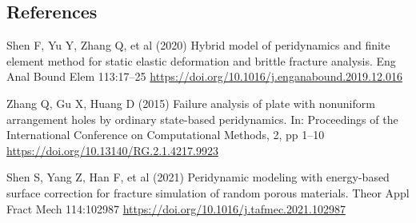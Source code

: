 \documentclass[11pt]{article}
\begin{document}
\subsection*{References}
\begin{enumerate}[label={[\arabic*]}]
      \item Shen F, Yu Y, Zhang Q, et al (2020) Hybrid model of peridynamics and finite element method for static elastic deformation and brittle fracture analysis. Eng Anal Bound Elem 113:17–25 \url{https://doi.org/10.1016/j.enganabound.2019.12.016}
      \item Zhang Q, Gu X, Huang D (2015) Failure analysis of plate with nonuniform arrangement holes by ordinary state-based peridynamics. In: Proceedings of the International Conference on Computational Methods, 2, pp 1–10 \url{https://doi.org/10.13140/RG.2.1.4217.9923}
      \item Shen S, Yang Z, Han F, et al (2021) Peridynamic modeling with energy-based surface correction for fracture simulation of random porous materials. Theor Appl Fract Mech 114:102987 \url{https://doi.org/10.1016/j.tafmec.2021.102987}
\end{enumerate}
\end{document}

